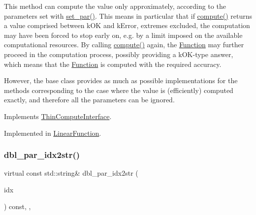 This method can compute the value only approximately, according to the parameters set with \mbox{\hyperlink{class_s_m_spp__di__unipi__it_1_1_thin_compute_interface_a73669f587bb938b587c54ad7e73ec297}{set\+\_\+par()}}. This means in particular that if \mbox{\hyperlink{class_s_m_spp__di__unipi__it_1_1_function_a504d4e3e174c7a518cc66156a8a45ce5}{compute()}} returns a value comprised between k\+OK and k\+Error, extremes excluded, the computation may have been forced to stop early on, e.\+g. by a limit imposed on the available computational resources. By calling \mbox{\hyperlink{class_s_m_spp__di__unipi__it_1_1_function_a504d4e3e174c7a518cc66156a8a45ce5}{compute()}} again, the \mbox{\hyperlink{class_s_m_spp__di__unipi__it_1_1_function}{Function}} may further proceed in the computation process, possibly providing a k\+O\+K-\/type answer, which means that the \mbox{\hyperlink{class_s_m_spp__di__unipi__it_1_1_function}{Function}} is computed with the required accuracy.

However, the base class provides as much as possible implementations for the methods corresponding to the case where the value is (efficiently) computed exactly, and therefore all the parameters can be ignored. 

Implements \mbox{\hyperlink{class_s_m_spp__di__unipi__it_1_1_thin_compute_interface_a00fd6363d98ea46bcc273842b327d050}{Thin\+Compute\+Interface}}.



Implemented in \mbox{\hyperlink{class_s_m_spp__di__unipi__it_1_1_linear_function_afc8ff54ab05d22f4cca0fb0bfbeb7a49}{Linear\+Function}}.

\mbox{\label{class_s_m_spp__di__unipi__it_1_1_function_a93f1297e7910e91cc18b303376191026}} 
\subsubsection{\texorpdfstring{dbl\+\_\+par\+\_\+idx2str()}{dbl\_par\_idx2str()}}
{\footnotesize\ttfamily virtual const std\+::string\& dbl\+\_\+par\+\_\+idx2str (\begin{DoxyParamCaption}\item[{const \mbox{\hyperlink{class_s_m_spp__di__unipi__it_1_1_thin_compute_interface_aa3d710629ad8c434286726ad810c3b47}{idx\+\_\+type}}}]{idx }\end{DoxyParamCaption}) const\hspace{0.3cm}{\ttfamily [inline]}, {\ttfamily [override]}, {\ttfamily [virtual]}}



